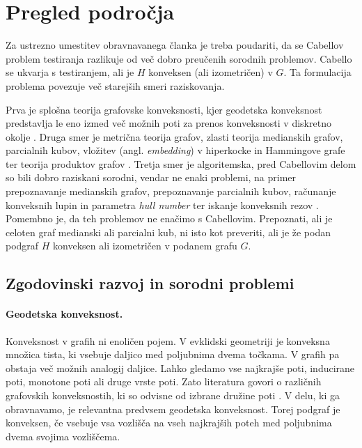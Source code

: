 \documentclass[sigconf
]{acmart}
\theoremstyle{definition}
\begin{document}
\section{Pregled področja}

Za ustrezno umestitev obravnavanega članka je treba poudariti, da se Cabellov problem testiranja razlikuje od več dobro preučenih sorodnih problemov.
Cabello se ukvarja s testiranjem, ali je \(H\) konveksen (ali izometričen) v \(G\).
Ta formulacija problema povezuje več starejših smeri raziskovanja.

Prva je splošna teorija grafovske konveksnosti, kjer geodetska konveksnost predstavlja le eno izmed več možnih poti za prenos konveksnosti v diskretno okolje \cite{changat2005convexities, pelayo2013geodesic}.
Druga smer je metrična teorija grafov, zlasti teorija medianskih grafov, parcialnih kubov, vložitev (angl. \emph{embedding}) v hiperkocke in Hammingove grafe ter teorija produktov grafov \cite{bandelt2008metric, ovchinnikov2011, hammack2011handbook}.
Tretja smer je algoritemska, pred Cabellovim delom so bili dobro raziskani sorodni, vendar ne enaki problemi, na primer prepoznavanje medianskih grafov, prepoznavanje parcialnih kubov, računanje konveksnih lupin in parametra \emph{hull number} ter iskanje konveksnih rezov \cite{dourado2009computation, eppstein2007recognizing, glantz2017finding}.
Pomembno je, da teh problemov ne enačimo s Cabellovim. Prepoznati, ali je celoten graf medianski ali parcialni kub, ni isto kot preveriti, ali je že podan podgraf \(H\) konveksen ali izometričen v podanem grafu \(G\).

\subsection{Zgodovinski razvoj in sorodni problemi}

\paragraph{Geodetska konveksnost.}
Konveksnost v grafih ni enoličen pojem.
V evklidski geometriji je konveksna množica tista, ki vsebuje daljico med poljubnima dvema točkama.
V grafih pa obstaja več možnih analogij daljice.
Lahko gledamo vse najkrajše poti, inducirane poti, monotone poti ali druge
vrste poti.
Zato literatura govori o različnih grafovskih konveksnostih, ki so odvisne od izbrane družine poti \cite{changat2005convexities}.
V delu, ki ga obravnavamo, je relevantna predvsem geodetska konveksnost.
Torej podgraf je konveksen, če vsebuje vsa vozlišča na vseh najkrajših
poteh med poljubnima dvema svojima vozliščema.
\end{document}
